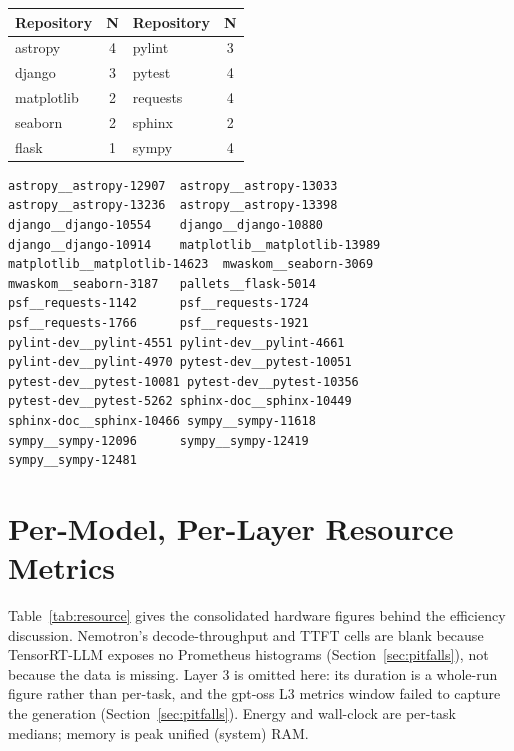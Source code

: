 \documentclass[10pt,twocolumn]{article}
\begin{document}
\begin{table}[h]
\centering\small
\begin{tabular}{@{}lc lc@{}}
\toprule
Repository & N & Repository & N \\
\midrule
astropy   & 4 & pylint    & 3 \\
django    & 3 & pytest    & 4 \\
matplotlib& 2 & requests  & 4 \\
seaborn   & 2 & sphinx    & 2 \\
flask     & 1 & sympy     & 4 \\
\bottomrule
\end{tabular}
\end{table}

\begin{lstlisting}
astropy__astropy-12907  astropy__astropy-13033
astropy__astropy-13236  astropy__astropy-13398
django__django-10554    django__django-10880
django__django-10914    matplotlib__matplotlib-13989
matplotlib__matplotlib-14623  mwaskom__seaborn-3069
mwaskom__seaborn-3187   pallets__flask-5014
psf__requests-1142      psf__requests-1724
psf__requests-1766      psf__requests-1921
pylint-dev__pylint-4551 pylint-dev__pylint-4661
pylint-dev__pylint-4970 pytest-dev__pytest-10051
pytest-dev__pytest-10081 pytest-dev__pytest-10356
pytest-dev__pytest-5262 sphinx-doc__sphinx-10449
sphinx-doc__sphinx-10466 sympy__sympy-11618
sympy__sympy-12096      sympy__sympy-12419
sympy__sympy-12481
\end{lstlisting}

\section{Per-Model, Per-Layer Resource Metrics}
\label{app:resource}

Table~\ref{tab:resource} gives the consolidated hardware figures behind the efficiency
discussion. Nemotron's decode-throughput and TTFT cells are blank because TensorRT-LLM exposes
no Prometheus histograms (Section~\ref{sec:pitfalls}), not because the data is missing. Layer 3 is omitted here:
its duration is a whole-run figure rather than per-task, and the gpt-oss L3 metrics window
failed to capture the generation (Section~\ref{sec:pitfalls}). Energy and wall-clock are per-task medians;
memory is peak unified (system) RAM.
\end{document}
